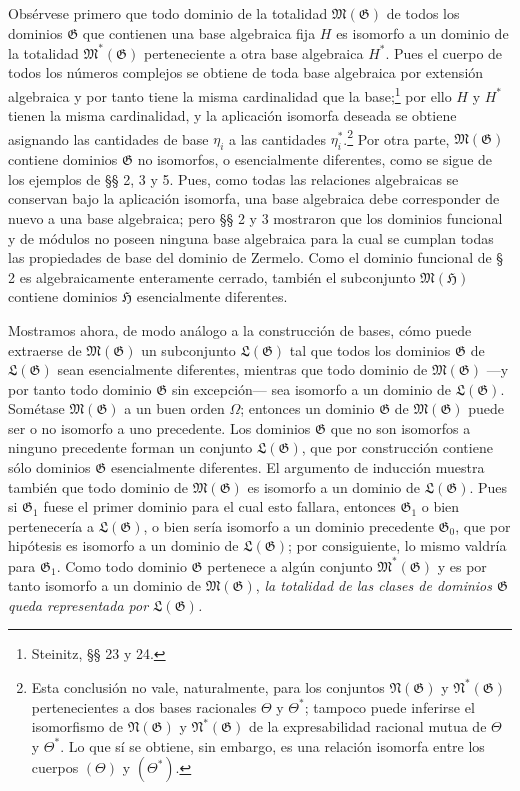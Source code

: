 \documentclass[11pt]{article}
\begin{document}
Obsérvese primero que todo dominio de la totalidad $\mathfrak M(\mathfrak G)$ de todos los dominios $\mathfrak G$ que contienen una base algebraica fija $H$ es isomorfo a un dominio de la totalidad $\mathfrak M^*(\mathfrak G)$ perteneciente a otra base algebraica $H^*$. Pues el cuerpo de todos los números complejos se obtiene de toda base algebraica por extensión algebraica y por tanto tiene la misma cardinalidad que la base;\footnote{Steinitz, §§ 23 y 24.} por ello $H$ y $H^*$ tienen la misma cardinalidad, y la aplicación isomorfa deseada se obtiene asignando las cantidades de base $\eta_i$ a las cantidades $\eta_i^*$.\footnote{Esta conclusión no vale, naturalmente, para los conjuntos $\mathfrak N(\mathfrak G)$ y $\mathfrak N^*(\mathfrak G)$ pertenecientes a dos bases racionales $\Theta$ y $\Theta^*$; tampoco puede inferirse el isomorfismo de $\mathfrak N(\mathfrak G)$ y $\mathfrak N^*(\mathfrak G)$ de la expresabilidad racional mutua de $\Theta$ y $\Theta^*$. Lo que sí se obtiene, sin embargo, es una relación isomorfa entre los cuerpos $(\Theta)$ y $(\Theta^*)$.} Por otra parte, $\mathfrak M(\mathfrak G)$ contiene dominios $\mathfrak G$ no isomorfos, o esencialmente diferentes, como se sigue de los ejemplos de §§ 2, 3 y 5. Pues, como todas las relaciones algebraicas se conservan bajo la aplicación isomorfa, una base algebraica debe corresponder de nuevo a una base algebraica; pero §§ 2 y 3 mostraron que los dominios funcional y de módulos no poseen ninguna base algebraica para la cual se cumplan todas las propiedades de base del dominio de Zermelo. Como el dominio funcional de § 2 es algebraicamente enteramente cerrado, también el subconjunto $\mathfrak M(\mathfrak H)$ contiene dominios $\mathfrak H$ esencialmente diferentes.

Mostramos ahora, de modo análogo a la construcción de bases, cómo puede extraerse de $\mathfrak M(\mathfrak G)$ un subconjunto $\mathfrak L(\mathfrak G)$ tal que todos los dominios $\mathfrak G$ de $\mathfrak L(\mathfrak G)$ sean esencialmente diferentes, mientras que todo dominio de $\mathfrak M(\mathfrak G)$ ---y por tanto todo dominio $\mathfrak G$ sin excepción--- sea isomorfo a un dominio de $\mathfrak L(\mathfrak G)$. Sométase $\mathfrak M(\mathfrak G)$ a un buen orden $\Omega$; entonces un dominio $\mathfrak G$ de $\mathfrak M(\mathfrak G)$ puede ser o no isomorfo a uno precedente. Los dominios $\mathfrak G$ que no son isomorfos a ninguno precedente forman un conjunto $\mathfrak L(\mathfrak G)$, que por construcción contiene sólo dominios $\mathfrak G$ esencialmente diferentes. El argumento de inducción muestra también que todo dominio de $\mathfrak M(\mathfrak G)$ es isomorfo a un dominio de $\mathfrak L(\mathfrak G)$. Pues si $\mathfrak G_1$ fuese el primer dominio para el cual esto fallara, entonces $\mathfrak G_1$ o bien pertenecería a $\mathfrak L(\mathfrak G)$, o bien sería isomorfo a un dominio precedente $\mathfrak G_0$, que por hipótesis es isomorfo a un dominio de $\mathfrak L(\mathfrak G)$; por consiguiente, lo mismo valdría para $\mathfrak G_1$. Como todo dominio $\mathfrak G$ pertenece a algún conjunto $\mathfrak M^*(\mathfrak G)$ y es por tanto isomorfo a un dominio de $\mathfrak M(\mathfrak G)$, \emph{la totalidad de las clases de dominios $\mathfrak G$ queda representada por $\mathfrak L(\mathfrak G)$.}
\end{document}
